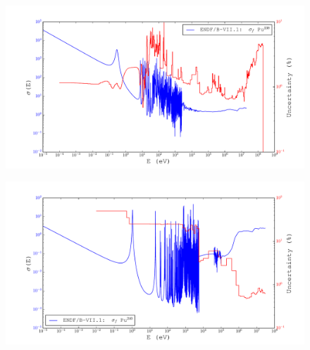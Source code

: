 \documentclass{beamer}
\begin{document}
\begin{frame}
  \begin{figure}[H]
    \begin{center}
      \hspace*{-0.7cm}\includegraphics[width=1.1\columnwidth]{../Weighting/X_Sections/XwVar_Pu_239_94_f.pdf}
      \vspace{-5mm}
      \label{fig:XPu239}
    \end{center}
  \end{figure}
\end{frame}

\begin{frame}
    \begin{figure}[H]
    \begin{center}
      \hspace*{-0.7cm}\includegraphics[width=1.1\columnwidth]{../Weighting/X_Sections/XwVar_Pu_240_94_f.pdf}
      \vspace{-5mm}
      \label{fig:XPu240}
    \end{center}
  \end{figure}
\end{frame}
\end{document}
